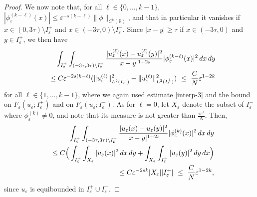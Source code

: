 \documentclass{article}
\newcommand{\e}{\varepsilon}
\begin{document}
\begin{proof}
We now note that, for all $\ell\in\{0,\dots, k-1\}$, $|\phi_\e^{(k-\ell)}(x)|\leq \e^{-s(k-\ell)} \|\phi\|_{C^k(\mathbb R)}$, and that in particular it vanishes if $x\in (0,3\tau)\setminus I_\e^+$ and $x\in (-3\tau,0)\setminus I_\e^-$.   
Since $|x-y|\geq \tau$ if $x\in (-3\tau,0)$ and $y\in I_\e^+$, we then have 
\begin{eqnarray}\label{f}
&&\hspace{-2cm}\int_{I_\e^+}\int_{(-3\tau,3\tau)\setminus I_\e^+} 
\frac{|u_\e^{(\ell)}(x)-u_\e^{(\ell)}(y)|^2}{|x-y|^{1+2s}} |\phi_\e^{(k-\ell)}(x)|^2\, dx\, dy
\nonumber\\
&&\leq C\e^{-2s(k-\ell)} 
(\|u_\e^{(\ell)}\|^2_{L^2(I_\e^-)}+\|u_\e^{(\ell)}\|^2_{L^2(I_\e^+)})
\ \leq \ \frac{C}{N}\e^{1-2k} 
\end{eqnarray}
for all $\ell\in\{1,\dots, k-1\}$, where we again used estimate \eqref{interp-3} and the bound on $F_\e(u_\e;I_\e^+)$ and on $F_\e(u_\e;I_\e^-)$. 
As for $\ell=0$, let $X_\e$ denote the subset of $I_\e^-$ where $\phi_\e^{(k)}\neq 0$, and note that its measure is not greater than $\frac{\tau\e^s}{N}$. Then,  
\begin{eqnarray}\label{f0}
&&\hspace{-2cm}\int_{I_\e^+}\int_{(-3\tau,3\tau)\setminus I_\e^+} 
\frac{|u_\e(x)-u_\e(y)|^2}{|x-y|^{1+2s}} |\phi_\e^{(k)}(x)|^2\, dx\, dy
\nonumber\\
&&\leq C\Big(\int_{I_\e^+} \int_{X_\e} |u_\e(x)|^2\, dx\, dy+
\int_{X_\e}\int_{I_\e^+}  |u_\e(y)|^2\, dy\, dx\Big)
\nonumber\\
&&\leq C\e^{-2sk} |X_\e| |I_\e^+|
\ \leq \ \frac{C}{N}\e^{1-2k},  
\end{eqnarray}
since $u_\e$ is equibounded in $I_\e^+\cup I_\e^-$. 


\end{proof}
\end{document}
